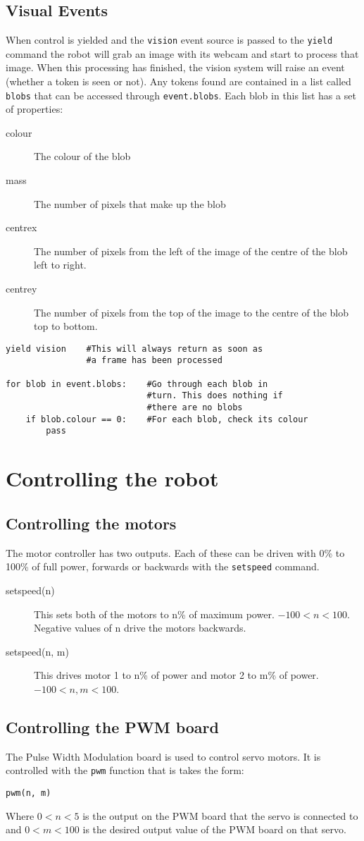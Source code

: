 \documentclass{article}
\begin{document}
\subsection{Visual Events}
When control is yielded and the \texttt{vision} event source is passed to the
\texttt{yield} command the robot will grab an image with its webcam and start
to process that image.  When this processing has finished, the vision system
will raise an event (whether a token is seen or not).  Any tokens found are
contained in a list called \texttt{blobs} that can be accessed through
\texttt{event.blobs}.  Each blob in this list has a set of properties:
\begin{description}
\item[colour] The colour of the blob
\item[mass] The number of pixels that make up the blob
\item[centrex] The number of pixels from the left of the image of the centre
of the blob left to right.
\item[centrey] The number of pixels from the top of the image to the
centre of the blob top to bottom.
\end{description}

\begin{verbatim}
yield vision    #This will always return as soon as
                #a frame has been processed

for blob in event.blobs:    #Go through each blob in 
                            #turn. This does nothing if
                            #there are no blobs
    if blob.colour == 0:    #For each blob, check its colour
        pass
\end{verbatim}
\section{Controlling the robot}
\subsection{Controlling the motors}
The motor controller has two outputs. Each of these can be driven with 0\% to
100\% of full power, forwards or backwards with the \texttt{setspeed} command.
\begin{description}
\item[setspeed(n)] This sets both of the motors to n\% of maximum
power.  $-100<n<100$. Negative values of n drive the motors backwards.
\item[setspeed(n, m)] This drives motor 1 to n\% of power and motor 2
to m\% of power. $-100<n,m<100$.
\end{description}
\subsection{Controlling the PWM board}
The Pulse Width Modulation board is used to control servo motors.  It is
controlled with the \texttt{pwm} function that is takes the form:

\texttt{pwm(n, m)}

Where $0<n<5$ is the output on the PWM board that the servo is connected to
and $0<m<100$ is the desired output value of the PWM board on that servo.
\end{document}
